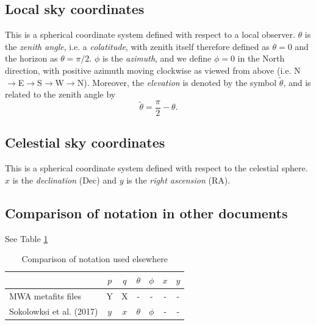 \documentclass{book}
\begin{document}
\subsection{Local sky coordinates}
\label{sec:coordslocalsky}

This is a spherical coordinate system defined with respect to a local observer.
$\theta$ is the \textit{zenith angle}, i.e. a \textit{colatitude}, with zenith itself therefore defined as $\theta = 0$ and the horizon as $\theta = \pi/2$.
$\phi$ is the \textit{azimuth}, and we define $\phi = 0$ in the North direction, with positive azimuth moving clockwise as viewed from above (i.e. N$\rightarrow$E$\rightarrow$S$\rightarrow$W$\rightarrow$N).
Moreover, the \textit{elevation} is denoted by the symbol $\tilde{\theta}$, and is related to the zenith angle by
\begin{equation}
    \tilde{\theta} = \frac{\pi}{2} - \theta.
\end{equation}

\subsection{Celestial sky coordinates}

This is a spherical coordinate system defined with respect to the celestial sphere.
$x$ is the \textit{declination} (Dec) and $y$ is the \textit{right ascension} (RA).

\subsection{Comparison of notation in other documents}

See Table \ref{tbl:notations}
\begin{table}[!hb]
    \centering
    \caption{Comparison of notation used elsewhere}
    \label{tbl:notations}
    \begin{tabular}{l|cc|cc|cc}
        & $p$ & $q$ & $\theta$ & $\phi$ & $x$ & $y$ \\
        \hline
        MWA metafits files       & Y & X & - & - & - & - \\
        Sokolowksi et al. (2017) & $y$ & $x$ & $\theta$ & $\phi$ & - & - \\
    \end{tabular}
\end{table}
\end{document}
